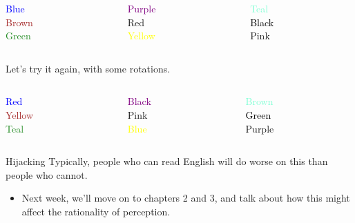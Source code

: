 \documentclass[
  17pt,
  letterpaper,
  ignorenonframetext,
  aspectratio=169,
  xcolor={dvipsnames}]{beamer}
\providecommand{\tightlist}{%
  \setlength{\itemsep}{0pt}\setlength{\parskip}{0pt}}\usepackage{longtable,booktabs,array}
\begin{document}
\begin{frame}
\begin{columns}[T]
\begin{column}{0.25\textwidth}
\Large{ \textcolor{Blue}{Blue} \\ \textcolor{Brown}{Brown}  \\ \textcolor{ForestGreen}{Green} }
\end{column}

\begin{column}{0.25\textwidth}
\Large{  \textcolor{Purple}{Purple}    \\  \textcolor{BrickRed}{Red}    \\     \textcolor{Yellow}{Yellow} }
\end{column}

\begin{column}{0.25\textwidth}
\Large{  \textcolor{Aquamarine}{Teal} \\  \textcolor{Black}{Black} \\  \textcolor{Rhodamine}{Pink} }
\end{column}
\end{columns}
\end{frame}

\begin{frame}
Let's try it again, with some rotations.
\end{frame}

\begin{frame}
\begin{columns}[T]
\begin{column}{0.25\textwidth}
\Large{ \textcolor{Blue}{Red} \\ \textcolor{Brown}{Yellow}  \\ \textcolor{ForestGreen}{Teal} }
\end{column}

\begin{column}{0.25\textwidth}
\Large{  \textcolor{Purple}{Black}    \\  \textcolor{BrickRed}{Pink}    \\     \textcolor{Yellow}{Blue} }
\end{column}

\begin{column}{0.25\textwidth}
\Large{  \textcolor{Aquamarine}{Brown} \\  \textcolor{Black}{Green} \\  \textcolor{Rhodamine}{Purple} }
\end{column}
\end{columns}
\end{frame}

\begin{frame}{Hijacking}
\protect\hypertarget{hijacking}{}
Typically, people who can read English will do worse on this than people
who cannot.

\begin{itemize}[<+->]
\tightlist
\item
  Next week, we'll move on to chapters 2 and 3, and talk about how this
  might affect the rationality of perception.
\end{itemize}
\end{frame}
\end{document}
